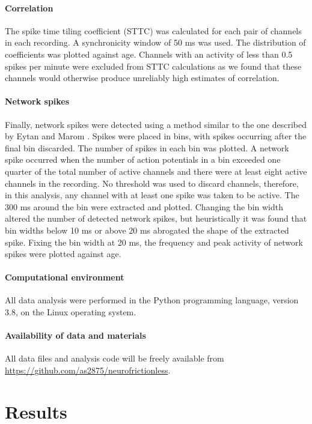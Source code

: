 \documentclass[doublespacing]{bmcart}
\begin{document}
\paragraph{Correlation} The spike time tiling coefficient (STTC) \cite{Cutts2014} was calculated for each pair of channels in each recording. A synchronicity window of 50 ms was used. The distribution of coefficients was plotted against age. Channels with an activity of less than 0.5 spikes per minute were excluded from STTC calculations as we found that these channels would otherwise produce unreliably high estimates of correlation. 

\paragraph{Network spikes} Finally, network spikes were detected using a method similar to the one described by Eytan and Marom \cite{Eytan2006}. Spikes were placed in bins, with spikes occurring after the final bin discarded. The number of spikes in each bin was plotted. A network spike occurred when the number of action potentials in a bin exceeded one quarter of the total number of active channels and there were at least eight active channels in the recording. No threshold was used to discard channels, therefore, in this analysis, any channel with at least one spike was taken to be active. The 300 ms around the bin were extracted and plotted. Changing the bin width altered the number of detected network spikes, but heuristically it was found that bin widths below 10 ms or above 20 ms abrogated the shape of the extracted spike. Fixing the bin width at 20 ms, the frequency and peak activity of network spikes were plotted against age.

\paragraph{Computational environment} All data analysis were performed
in the Python programming language, version 3.8, on the Linux operating system.

\paragraph{Availability of data and materials}

All data files and analysis code will be freely available from
\url{https://github.com/as2875/neurofrictionless}.

\section*{Results}
\end{document}
